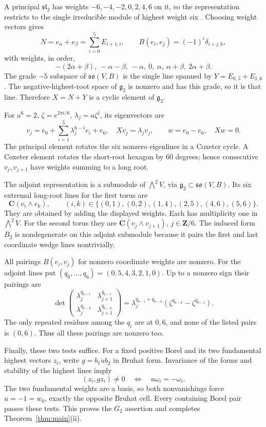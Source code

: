\documentclass[11pt]{article}
\newcommand{\C}{\mathbf C}\newcommand{\Z}{\mathbf Z}\newcommand{\Q}{\mathbf Q}
\newcommand{\g}{\mathfrak g}\newcommand{\tfr}{\mathfrak t}
\theoremstyle{definition}\newtheorem{definition}[theorem]{Definition}
\theoremstyle{remark}\newtheorem{remark}[theorem]{Remark}
\begin{document}
A principal $\mathfrak{sl}_2$ has weights $-6,-4,-2,0,2,4,6$ on it, so the representation restricts to the single irreducible module of highest weight six \citep[\S33.3, p.~149]{Etingof}. Choosing weight vectors gives
\[
 N=e_\alpha+e_\beta=\sum_{i=0}^5E_{i+1,i},\qquad
 B(e_i,e_j)=(-1)^i\delta_{i+j,6},
\]
with weights, in order,
\[
 -(2\alpha+\beta),\ -\alpha-\beta,\ -\alpha,\ 0,\
 \alpha,\ \alpha+\beta,\ 2\alpha+\beta.
\]
The grade $-5$ subspace of $\mathfrak{so}(V,B)$ is the single line spanned by $Y=E_{0,5}+E_{1,6}$. The negative-highest-root space of $\g_2$ is nonzero and has this grade, so it is that line. Therefore $X=N+Y$ is a cyclic element of $\g_2$.

For $a^6=2$, $\zeta=e^{2\pi i/6}$, $\lambda_j=a\zeta^j$, its eigenvectors are
\[
 v_j=e_0+\sum_{i=1}^5\lambda_j^{6-i}e_i+e_6,
 \quad Xv_j=\lambda_jv_j,
 \qquad w=e_0-e_6,\quad Xw=0.
\]
The principal element rotates the six nonzero eigenlines in a Coxeter cycle. A Coxeter element rotates the short-root hexagon by $60$ degrees; hence consecutive $v_j,v_{j+1}$ have weights summing to a long root.

The adjoint representation is a submodule of $\bigwedge^2V$, via $\g_2\subset\mathfrak{so}(V,B)$. Its six extremal long-root lines for the first torus are
\[
 \C(e_i\wedge e_k),\qquad
 (i,k)\in\{(0,1),(0,2),(1,4),(2,5),(4,6),(5,6)\}.
\]
They are obtained by adding the displayed weights. Each has multiplicity one in $\bigwedge^2V$. For the second torus they are $\C(v_j\wedge v_{j+1})$, $j\in\Z/6$. The induced form $B_2$ is nondegenerate on this adjoint submodule because it pairs the first and last coordinate wedge lines nontrivially.

All pairings $B(e_i,v_j)$ for nonzero coordinate weights are nonzero. For the adjoint lines put $(q_0,\ldots,q_6)=(0,5,4,3,2,1,0)$. Up to a nonzero sign their pairings are
\[
 \det\begin{pmatrix}
 \lambda_j^{q_{6-i}}&\lambda_{j+1}^{q_{6-i}}\\
 \lambda_j^{q_{6-k}}&\lambda_{j+1}^{q_{6-k}}
 \end{pmatrix}
 =\lambda_j^{q_{6-i}+q_{6-k}}
   (\zeta^{q_{6-k}}-\zeta^{q_{6-i}}).
\]
The only repeated residues among the $q_i$ are at $0,6$, and none of the listed pairs is $(0,6)$. Thus all these pairings are nonzero too.

Finally, these two tests suffice. For a fixed positive Borel and its two fundamental highest vectors $z_i$, write $g=b_1\dot u b_2$ in Bruhat form. Invariance of the forms and stability of the highest lines imply
\[
 (z_i,gz_i)\ne0\quad\Longleftrightarrow\quad u\omega_i=-\omega_i.
\]
The two fundamental weights are a basis, so both nonvanishings force $u=-1=w_0$, exactly the opposite Bruhat cell. Every containing Borel pair passes these tests. This proves the $G_2$ assertion and completes Theorem~\ref{thm:main}(ii).
\end{document}

